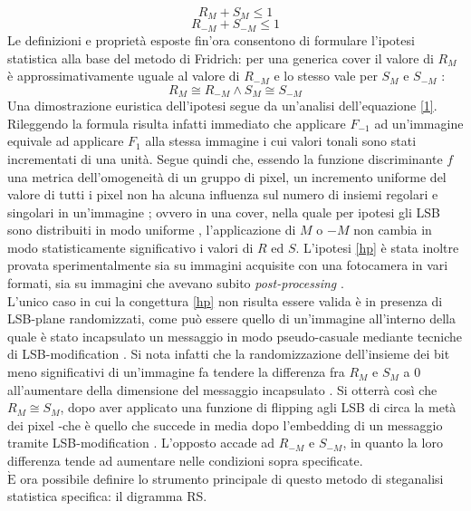 \[R_M + S_M \leq 1\]
\[R_{-M} + S_{-M} \leq 1\]
Le definizioni e proprietà esposte fin'ora consentono di formulare l'ipotesi statistica alla base del metodo di Fridrich: per una generica cover il valore di $R_M$ è approssimativamente uguale al valore di $R_{-M}$ e lo stesso vale per $S_{M}$ e $S_{-M}$ \cite{fried1, fried2}:
\begin{equation}
\label{hp}
R_{M} \cong R_{-M} \wedge S_{M} \cong S_{-M} 
\end{equation}
Una dimostrazione euristica dell'ipotesi segue da un'analisi dell'equazione \ref{1}. Rileggendo la formula risulta infatti immediato che applicare $F_{-1}$ ad un'immagine equivale ad applicare $F_1$ alla stessa immagine i cui valori tonali sono stati incrementati di una unità. Segue quindi che, essendo la funzione discriminante $f$ una metrica dell'omogeneità di un gruppo di pixel, un incremento uniforme del valore di tutti i pixel non ha alcuna influenza sul numero di insiemi regolari e singolari in un'immagine \cite{fried1, fried2}; ovvero in una cover, nella quale per ipotesi gli LSB sono distribuiti in modo uniforme \cite{fried1, fried2, chisq, survey, survey2}, l'applicazione di $M$ o $-M$ non cambia in modo statisticamente significativo i valori di $R$ ed $S$.
L'ipotesi \ref{hp} è stata inoltre provata sperimentalmente sia su immagini acquisite con una fotocamera in vari formati, sia su immagini che avevano subito \textit{post-processing} \cite{fried2}.\\L'unico caso in cui la congettura \ref{hp} non risulta essere valida è in presenza di LSB-plane randomizzati, come può essere quello di un'immagine all'interno della quale è stato incapsulato un messaggio in modo pseudo-casuale mediante tecniche di LSB-modification \cite{fried2}. Si nota infatti che la randomizzazione dell'insieme dei bit meno significativi di un'immagine fa tendere la differenza fra $R_M$ e $S_M$ a 0 all'aumentare della dimensione del messaggio incapsulato \cite{fried1, fried2}. Si otterrà così che $R_M \cong S_M$, dopo aver applicato una funzione di flipping agli LSB di circa la metà dei pixel -che è quello che succede in media dopo l'embedding di un messaggio tramite LSB-modification \cite{seeingTheUnseen, warfare}. L'opposto accade ad $R_{-M}$ e $S_{-M}$, in quanto la loro differenza tende ad aumentare nelle condizioni sopra specificate.\\$\mathrm{\grave{E}}$ ora possibile definire lo strumento principale di questo metodo di steganalisi statistica specifica: il digramma RS.


